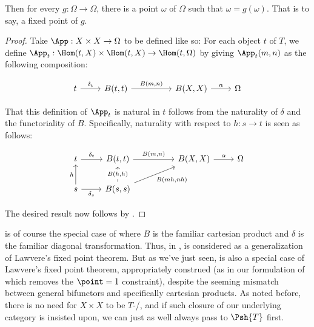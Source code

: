 Then for every $g : \Omega \to \Omega$, there is a point $\omega$ of $\Omega$ such that $\omega = g(\omega)$. That is to say, a fixed point of $g$.
\begin{proof}
Take $\App : X \times X \to \Omega$ to be defined like so: For each object $t$ of $T$, we define $\App_t : \Hom(t, X) \times \Hom(t, X) \to \Hom(t, \Omega)$ by giving $\App_t(m, n)$ as the following composition:

\[\begin{tikzcd}
	t & {B(t, t)} && {B(X, X)} & \Omega
	\arrow["{\delta_{t}}", from=1-1, to=1-2]
	\arrow["{B(m, n)}", from=1-2, to=1-4]
	\arrow["\alpha", from=1-4, to=1-5]
\end{tikzcd}\]

That this definition of $\App_t$ is natural in $t$ follows from the naturality of $\delta$ and the functoriality of $B$. Specifically, naturality with respect to $h: s \to t$ is seen as follows:

\[\begin{tikzcd}
	t & {B(t, t)} && {B(X, X)} & \Omega \\
	s & {B(s, s)}
	\arrow["{\delta_{t}}", from=1-1, to=1-2]
	\arrow["{B(m, n)}", from=1-2, to=1-4]
	\arrow["\alpha", from=1-4, to=1-5]
	\arrow["{\delta_s}"', from=2-1, to=2-2]
	\arrow["h", from=2-1, to=1-1]
	\arrow["{B(h, h)}"{description}, from=2-2, to=1-2]
	\arrow["{B(m h, n h)}"', from=2-2, to=1-4]
\end{tikzcd}\]

The desired result now follows by .
\end{proof}
 is of course the special case of  where $B$ is the familiar cartesian product and $\delta$ is the familiar diagonal transformation. Thus, in \autocite{roberts2021substructural},  is considered as a generalization of Lawvere's fixed point theorem. But as we've just seen,  is also a special case of Lawvere's fixed point theorem, appropriately construed (as in our formulation of  which removes the $\point = 1$ constraint), despite the seeming mismatch between general bifunctors and specifically cartesian products. As noted before, there is no need for $X \times X$ to be $T$-\repsmall/, and if such closure of our underlying category is insisted upon, we can just as well always pass to $\Psh{T}$ first.

